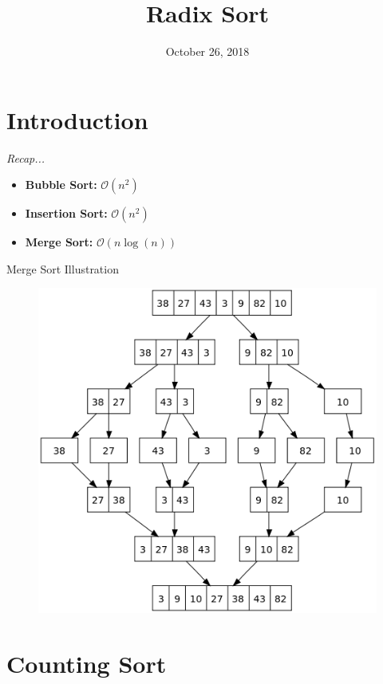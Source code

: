 \documentclass{beamer}
\title[Radix Sort---Computer Science Club]{\textbf{Radix Sort}}
\institute{Stephen Lewis Secondary School \\[3ex] {\large Computer Science Club}}
\date{October 26, 2018}
\begin{document}
\begin{frame} 
\titlepage 
\end{frame} 

\section{Introduction}

\begin{frame}{\textit{Recap...}}
\begin{itemize}
    \item \textbf{Bubble Sort:} $\mathcal{O}(n^2)$
    \item \textbf{Insertion Sort:} $\mathcal{O}(n^2)$
    \item \textbf{Merge Sort:} $\mathcal{O}(n \log(n))$
\end{itemize}
\end{frame}

\begin{frame}{Merge Sort Illustration}
    \begin{figure}
        \centering
        \includegraphics[scale=0.3]{lessons/images/merge_sort.png}
    \end{figure}
\end{frame}

\section{Counting Sort}
\end{document}
